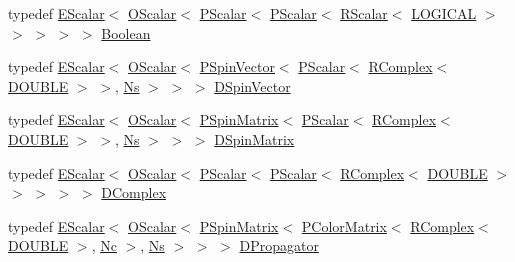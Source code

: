 \begin{DoxyCompactItemize}
\item 
typedef \mbox{\hyperlink{classENSEM_1_1EScalar}{E\+Scalar}}$<$ \mbox{\hyperlink{classENSEM_1_1OScalar}{O\+Scalar}}$<$ \mbox{\hyperlink{classENSEM_1_1PScalar}{P\+Scalar}}$<$ \mbox{\hyperlink{classENSEM_1_1PScalar}{P\+Scalar}}$<$ \mbox{\hyperlink{classENSEM_1_1RScalar}{R\+Scalar}}$<$ \mbox{\hyperlink{namespaceENSEM_ade7c8d5976e979516f8c2ecd223dd0b6}{L\+O\+G\+I\+C\+AL}} $>$ $>$ $>$ $>$ $>$ \mbox{\hyperlink{group__defs_ga38f0cd64d26e121e75367986f2d7cd6c}{Boolean}}
\item 
typedef \mbox{\hyperlink{classENSEM_1_1EScalar}{E\+Scalar}}$<$ \mbox{\hyperlink{classENSEM_1_1OScalar}{O\+Scalar}}$<$ \mbox{\hyperlink{classENSEM_1_1PSpinVector}{P\+Spin\+Vector}}$<$ \mbox{\hyperlink{classENSEM_1_1PScalar}{P\+Scalar}}$<$ \mbox{\hyperlink{classENSEM_1_1RComplex}{R\+Complex}}$<$ \mbox{\hyperlink{namespaceENSEM_adcbd0de4e9e0e7ef6aa9b681a554e2c5}{D\+O\+U\+B\+LE}} $>$ $>$, \mbox{\hyperlink{namespaceENSEM_a6f05e048f9b2eb1a19131074f8abc25f}{Ns}} $>$ $>$ $>$ \mbox{\hyperlink{group__defs_gab4f32134903c54aa9441e3bff44b44f5}{D\+Spin\+Vector}}
\item 
typedef \mbox{\hyperlink{classENSEM_1_1EScalar}{E\+Scalar}}$<$ \mbox{\hyperlink{classENSEM_1_1OScalar}{O\+Scalar}}$<$ \mbox{\hyperlink{classENSEM_1_1PSpinMatrix}{P\+Spin\+Matrix}}$<$ \mbox{\hyperlink{classENSEM_1_1PScalar}{P\+Scalar}}$<$ \mbox{\hyperlink{classENSEM_1_1RComplex}{R\+Complex}}$<$ \mbox{\hyperlink{namespaceENSEM_adcbd0de4e9e0e7ef6aa9b681a554e2c5}{D\+O\+U\+B\+LE}} $>$ $>$, \mbox{\hyperlink{namespaceENSEM_a6f05e048f9b2eb1a19131074f8abc25f}{Ns}} $>$ $>$ $>$ \mbox{\hyperlink{group__defs_ga3d56e7ee2403fec93fff9b7d4cd7d7cf}{D\+Spin\+Matrix}}
\item 
typedef \mbox{\hyperlink{classENSEM_1_1EScalar}{E\+Scalar}}$<$ \mbox{\hyperlink{classENSEM_1_1OScalar}{O\+Scalar}}$<$ \mbox{\hyperlink{classENSEM_1_1PScalar}{P\+Scalar}}$<$ \mbox{\hyperlink{classENSEM_1_1PScalar}{P\+Scalar}}$<$ \mbox{\hyperlink{classENSEM_1_1RComplex}{R\+Complex}}$<$ \mbox{\hyperlink{namespaceENSEM_adcbd0de4e9e0e7ef6aa9b681a554e2c5}{D\+O\+U\+B\+LE}} $>$ $>$ $>$ $>$ $>$ \mbox{\hyperlink{group__defs_ga06619af4c8e964a05d234fc7113321a6}{D\+Complex}}
\item 
typedef \mbox{\hyperlink{classENSEM_1_1EScalar}{E\+Scalar}}$<$ \mbox{\hyperlink{classENSEM_1_1OScalar}{O\+Scalar}}$<$ \mbox{\hyperlink{classENSEM_1_1PSpinMatrix}{P\+Spin\+Matrix}}$<$ \mbox{\hyperlink{classENSEM_1_1PColorMatrix}{P\+Color\+Matrix}}$<$ \mbox{\hyperlink{classENSEM_1_1RComplex}{R\+Complex}}$<$ \mbox{\hyperlink{namespaceENSEM_adcbd0de4e9e0e7ef6aa9b681a554e2c5}{D\+O\+U\+B\+LE}} $>$, \mbox{\hyperlink{namespaceENSEM_aabe0c3018e0246aaae1602fa5c08b58a}{Nc}} $>$, \mbox{\hyperlink{namespaceENSEM_a6f05e048f9b2eb1a19131074f8abc25f}{Ns}} $>$ $>$ $>$ \mbox{\hyperlink{group__defs_ga4dacc58a6c2cf15e6072cd6fe4415a7c}{D\+Propagator}}

\end{DoxyCompactItemize}
